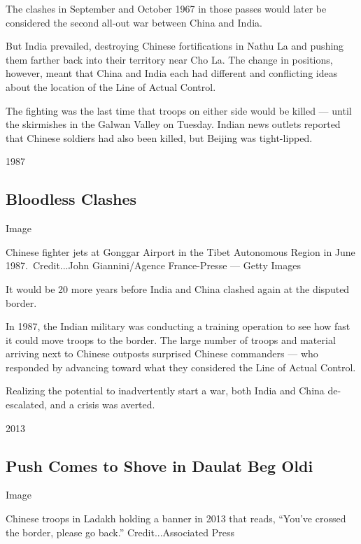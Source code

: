 The clashes in September and October 1967 in those passes would later be
considered the second all-out war between China and India.

But India prevailed, destroying Chinese fortifications in Nathu La and
pushing them farther back into their territory near Cho La. The change
in positions, however, meant that China and India each had different and
conflicting ideas about the location of the Line of Actual Control.

The fighting was the last time that troops on either side would be
killed --- until the skirmishes in the Galwan Valley on Tuesday. Indian
news outlets reported that Chinese soldiers had also been killed, but
Beijing was tight-lipped.

1987

\hypertarget{bloodless-clashes}{%
\subsection{Bloodless Clashes}\label{bloodless-clashes}}

Image

Chinese fighter jets at Gonggar Airport in the Tibet Autonomous Region
in June 1987.~Credit...John Giannini/Agence France-Presse --- Getty
Images

It would be 20 more years before India and China clashed again at the
disputed border.

In 1987, the Indian military was conducting a training operation to see
how fast it could move troops to the border. The large number of troops
and material arriving next to Chinese outposts surprised Chinese
commanders --- who responded by advancing toward what they considered
the Line of Actual Control.

Realizing the potential to inadvertently start a war, both India and
China de-escalated, and a crisis was averted.

2013

\hypertarget{push-comes-to-shove-in-daulat-beg-oldi}{%
\subsection{Push Comes to Shove in Daulat Beg
Oldi}\label{push-comes-to-shove-in-daulat-beg-oldi}}

Image

Chinese troops in Ladakh holding a banner in 2013 that reads, ``You've
crossed the border, please go back.'' Credit...Associated Press

